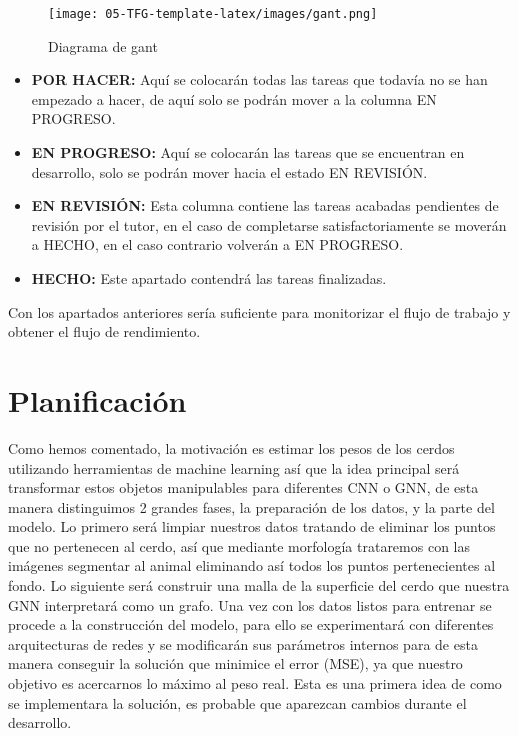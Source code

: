 \documentclass[12pt,a4paper]{article}
\begin{document}
\begin{figure}[!]
\caption{Diagrama de gant}
\centering
\texttt{[image: 05-TFG-template-latex/images/gant.png]}
\label{gant}
\end{figure}
\begin{itemize}
  \item \textbf{POR HACER: }Aquí se colocarán todas las tareas que todavía no se han empezado a hacer, de aquí solo se podrán mover a la columna EN PROGRESO.
  \item \textbf{EN PROGRESO: }Aquí se colocarán las tareas que se encuentran en desarrollo, solo se podrán mover hacia el estado EN REVISIÓN.
  \item \textbf{EN REVISIÓN: }Esta columna contiene las tareas acabadas pendientes de revisión por el tutor, en el caso de completarse satisfactoriamente se moverán a HECHO, en el caso contrario volverán a EN PROGRESO.
  \item \textbf{HECHO: }Este apartado contendrá las tareas finalizadas.
\end{itemize}


Con los apartados anteriores sería suficiente para monitorizar el flujo de trabajo y obtener el flujo de rendimiento.



\section{Planificación}




Como hemos comentado, la motivación es estimar los pesos de los cerdos utilizando herramientas de machine learning así que la idea principal será transformar estos objetos manipulables para diferentes CNN o GNN, de esta manera distinguimos 2 grandes fases, la preparación de los datos, y la parte del modelo. Lo primero será limpiar nuestros datos tratando de eliminar los puntos que no pertenecen al cerdo, así que mediante morfología trataremos con las imágenes segmentar al animal eliminando así todos los puntos pertenecientes al fondo. Lo siguiente será construir una malla de la superficie del cerdo que nuestra GNN interpretará como un grafo. Una vez con los datos listos para entrenar se procede a la construcción del modelo, para ello se experimentará con diferentes arquitecturas de redes y se modificarán sus parámetros internos para de esta manera conseguir la solución que minimice el error (MSE), ya que nuestro objetivo es acercarnos lo máximo al peso real. Esta es una primera idea de como se implementara la solución, es probable que aparezcan cambios durante el desarrollo.
\end{document}
